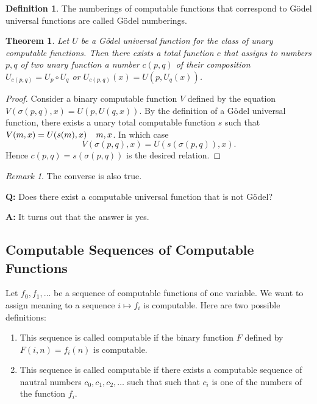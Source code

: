 \documentclass[10pt, letterpaper]{article}
\newtheorem{thm}{Theorem}
\theoremstyle{remark}
\newtheorem{rem}{Remark}
\theoremstyle{definition}
\newtheorem{defn}{Definition}
\begin{document}
\begin{defn}
    The numberings of computable functions that correspond to G\"{o}del universal functions are called G\"{o}del numberings.
\end{defn}

\begin{thm}
    Let $U$ be a G\"{o}del universal function for the class of unary computable functions. Then there exists a 
    total function $c$ that assigns to numbers $p,q$ of two unary function a number $c(p,q)$ of their composition $U_{c(p,q)} = U_p \circ U_q$
    or $U_{c(p,q)}(x) = U(p,U_q(x))$.
\end{thm}

\begin{proof}
    Consider a binary computable function $V$ defined by the equation $V(\sigma(p,q), x) = U(p,U(q,x))$. By the definition 
    of a G\"{o}del universal function, there exists a unary total computable function $s$ such that $V(m,x)=U(s(m),x) \hspace*{.15in} m,x$.
    In which case
    \[
        V(\sigma(p,q),x) = U(s(\sigma(p,q)),x).
    \]
    Hence $c(p,q) = s(\sigma(p,q))$ is the desired relation.
\end{proof}

\begin{rem}
    The converse is also true.
\end{rem}

\textbf{Q: } Does there exist a computable universal function that is not G\"{o}del? 

\textbf{A: } It turns out that the answer is yes.

\subsection*{Computable Sequences of Computable Functions}

Let $f_0, f_1, \ldots$ be a sequence of computable functions of one variable. We want to assign meaning to a sequence 
$i \mapsto f_i$ is computable. Here are two possible definitions:

\begin{enumerate}
    \item This sequence is called computable if the binary function $F$ defined by $F(i,n) = f_i(n)$ is computable.
    \item This sequence is called computable if there exists a computable sequence of nautral numbers $c_0, c_1, c_2, \ldots$ such that 
    such that $c_i$ is one of the numbers of the function $f_i$.
\end{enumerate}
\end{document}

